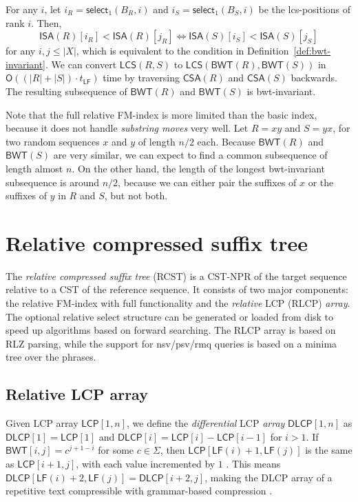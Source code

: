 \documentclass[a4paper,11pt]{llncs}
\newcommand{\abs}[1]{\ensuremath{\lvert #1 \rvert}}
\newcommand{\CST}{\textsf{CST}}
\newcommand{\CSTnpr}{\textsf{CST\nobreakdash-NPR}}
\newcommand{\RCST}{\textsf{RCST}}
\newcommand{\mISA}{\ensuremath{\mathsf{ISA}}}
\newcommand{\mBWT}{\ensuremath{\mathsf{BWT}}}
\newcommand{\mCSA}{\ensuremath{\mathsf{CSA}}}
\newcommand{\LCP}{\textsf{LCP}}
\newcommand{\DLCP}{\textsf{DLCP}}
\newcommand{\RLCP}{\textsf{RLCP}}
\newcommand{\mLCP}{\ensuremath{\mathsf{LCP}}}
\newcommand{\mDLCP}{\ensuremath{\mathsf{DLCP}}}
\newcommand{\RLZ}{\textsf{RLZ}}
\newcommand{\mLCS}{\ensuremath{\mathsf{LCS}}}
\newcommand{\nsv}{\textsf{nsv}}
\newcommand{\psv}{\textsf{psv}}
\newcommand{\rmq}{\textsf{rmq}}
\newcommand{\mLF}{\ensuremath{\mathsf{LF}}}
\newcommand{\mselect}{\ensuremath{\mathsf{select}}}
\newcommand{\Oh}{\ensuremath{\mathsf{O}}}
\begin{document}
For any $i$, let $i_{R} = \mselect_{1}(B_{R}, i)$ and $i_{S} =
\mselect_{1}(B_{S}, i)$ be the lcs-positions of rank $i$. Then,
$$
\mISA(R)[i_{R}] < \mISA(R)[j_{R}] \iff \mISA(S)[i_{S}] < \mISA(S)[j_{S}]
$$
for any $i,j \le \abs{X}$, which is equivalent to the condition in
Definition~\ref{def:bwt-invariant}. We can convert $\mLCS(R,S)$ to
$\mLCS(\mBWT(R),\mBWT(S))$ in $\Oh((\abs{R}+\abs{S}) \cdot t_{\mLF})$ time by
traversing $\mCSA(R)$ and $\mCSA(S)$ backwards. The resulting subsequence of
$\mBWT(R)$ and $\mBWT(S)$ is bwt-invariant.

Note that the full relative FM-index is more limited than the basic index,
because it does not handle \emph{substring moves} very well. Let $R = xy$ and
$S = yx$, for two random sequences $x$ and $y$ of length $n/2$ each. Because
$\mBWT(R)$ and $\mBWT(S)$ are very similar, we can expect to find a common
subsequence of length almost $n$. On the other hand, the length of the longest
bwt-invariant subsequence is around $n/2$, because we can either pair the
suffixes of $x$ or the suffixes of $y$ in $R$ and $S$, but not both.


\section{Relative compressed suffix tree}

The \emph{relative compressed suffix tree} (\RCST) is a \CSTnpr{} of the
target sequence relative to a \CST{} of the reference sequence. It consists of
two major components: the relative FM-index with full functionality and the
\emph{relative} \LCP{} (\RLCP) \emph{array}. The optional relative select
structure can be generated or loaded from disk to speed up algorithms based on
forward searching. The \RLCP{} array is based on \RLZ{} parsing, while the
support for \nsv/\psv/\rmq{} queries is based on a minima tree over the
phrases.

\subsection{Relative \LCP{} array}

Given \LCP{} array $\mLCP[1,n]$, we define the \emph{differential} \LCP{}
\emph{array} $\mDLCP[1,n]$ as $\mDLCP[1] = \mLCP[1]$ and $\mDLCP[i] = \mLCP[i]
- \mLCP[i-1]$ for $i > 1$. If $\mBWT[i,j] = c^{j+1-i}$ for some $c \in
\Sigma$, then $\mLCP[\mLF(i)+1,\mLF(j)]$ is the same as $\mLCP[i+1,j]$, with
each value incremented by $1$ \cite{Fischer2009a}. This means
$\mDLCP[\mLF(i)+2,\mLF(j)] = \mDLCP[i+2,j]$, making the \DLCP{} array of a
repetitive text compressible with grammar-based compression
\cite{Abeliuk2013}.
\end{document}

